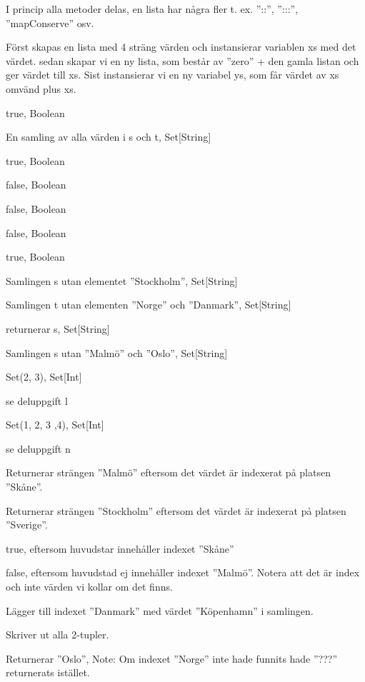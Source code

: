 \Task %

\Subtask
I princip alla metoder delas, en lista har några fler t. ex. ''::'', '':::'', ''mapConserve'' osv.

\Subtask
Först skapas en lista med 4 sträng värden och instansierar variablen xs med det värdet.
sedan skapar vi en ny lista, som består av ''zero'' + den gamla listan och ger värdet till xs.
Sist instansierar vi en ny variabel ys, som får värdet av xs omvänd plus xs.

\Task %

\Subtask
true, Boolean

\Subtask
En samling av alla värden i s och t, Set[String]

\Subtask
true, Boolean

\Subtask
false, Boolean

\Subtask
false, Boolean

\Subtask
false, Boolean

\Subtask
true, Boolean

\Subtask
Samlingen s utan elementet ''Stockholm'', Set[String]

\Subtask
Samlingen t utan elementen ''Norge'' och ''Danmark'', Set[String]

\Subtask
returnerar s, Set[String]

\Subtask
Samlingen s utan ''Malmö'' och ''Oslo'', Set[String]

\Subtask
Set(2, 3), Set[Int]

\Subtask
se deluppgift l

\Subtask
Set(1, 2, 3 ,4), Set[Int]

\Subtask
se deluppgift n

\Task %

\Subtask
Returnerar strängen ''Malmö'' eftersom det värdet är indexerat på platsen ''Skåne''.

\Subtask
Returnerar strängen ''Stockholm'' eftersom det värdet är indexerat på platsen ''Sverige''.

\Subtask
true, eftersom huvudstar innehåller indexet ''Skåne''

\Subtask
false, eftersom huvudstad ej innehåller indexet ''Malmö''. Notera att det är index och inte värden vi
kollar om det finns.

\Subtask
Lägger till indexet ''Danmark'' med värdet ''Köpenhamn'' i samlingen.

\Subtask
Skriver ut alla 2-tupler.

\Subtask
Returnerar ''Oslo'', Note: Om indexet ''Norge'' inte hade funnits hade ''???'' returnerats istället.


